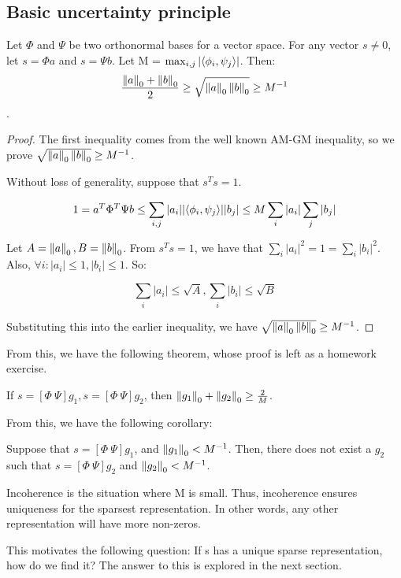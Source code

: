 \documentclass[12pt]{report}
\begin{document}
\subsection{Basic uncertainty principle}
\begin{theorem}
Let $\Phi$ and $\Psi$ be two orthonormal bases for a vector space. For any vector $s \neq 0$, let $s = \Phi a$ and $s = \Psi b$. Let M = $\max_{i,j}|\langle\phi_i, \psi_j\rangle|$. Then:
$$\frac{\left\| a\right\|_0 + \left\| b\right\|_0}{2} \geq \sqrt{\left\| a\right\|_0\left\| b\right\|_0} \geq M^{-1}$$.
\end{theorem}
\begin{proof}
The first inequality comes from the well known AM-GM inequality, so we prove $\sqrt{\left\| a\right\|_0\left\| b\right\|_0} \geq M^{-1}$.

Without loss of generality, suppose that $s^{T}s = 1$.

$$1 = a^{T}\Phi^{T}\Psi b \leq \sum_{i,j} |a_i||\langle\phi_i, \psi_j\rangle||b_j| \leq M\sum_i |a_i| \sum_j |b_j|$$

Let $A = \left\| a\right\|_0, B = \left\| b\right\|_0$. From $s^{T}s = 1$, we have that $\sum_i |a_i|^{2} = 1 = \sum_i |b_i|^{2}$. Also, $\forall i: |a_i| \leq 1, |b_i| \leq 1$. So:
 
$$\sum_i |a_i| \leq \sqrt{A}, \sum_i |b_i| \leq \sqrt{B}$$

Substituting this into the earlier inequality, we have $\sqrt{\left\| a\right\|_0\left\| b\right\|_0} \geq M^{-1}$.
\end{proof}

From this, we have the following theorem, whose proof is left as a homework exercise.

\begin{theorem}
If $s = [\Phi\ \Psi]g_1, s = [\Phi\ \Psi]g_2$, then $\left\| g_1\right\|_0 + \left\| g_2\right\|_0 \geq \frac{2}{M}$.
\end{theorem}

From this, we have the following corollary:
\begin{corollary}
Suppose that $s = [\Phi\ \Psi]g_1$, and $\left\| g_1\right\|_0 < M^{-1}$. Then, there does not exist a $g_2$ such that $s = [\Phi\ \Psi]g_2$ and $\left\| g_2\right\|_0 < M^{-1}$.
\end{corollary}


Incoherence is the situation where M is small. Thus, incoherence ensures uniqueness for the sparsest representation. In other words, any other representation will have more non-zeros.

This motivates the following question: If s has a unique sparse representation, how do we find it? The answer to this is explored in the next section.
\end{document}
